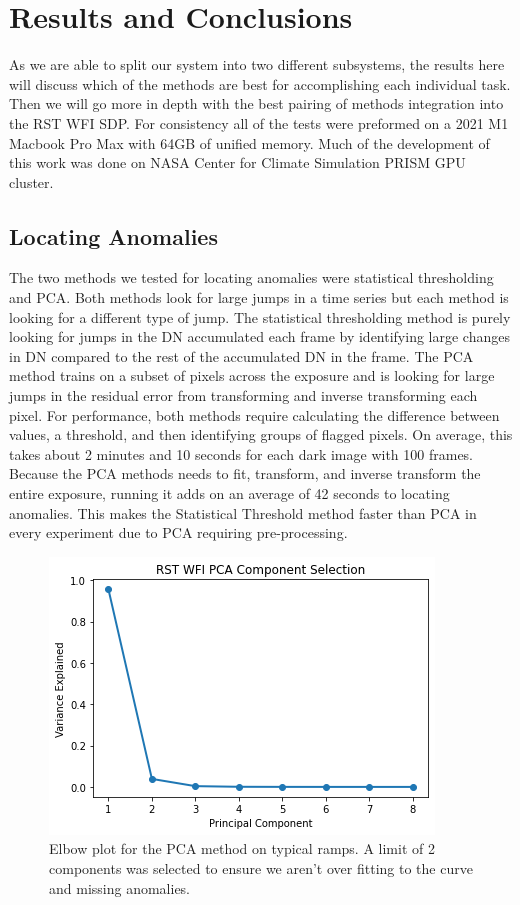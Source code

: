 \section{Results and Conclusions}
\label{chap5/sec:results}

As we are able to split our system into two different subsystems, the results here will discuss which of the methods are best for accomplishing each individual task. 
Then we will go more in depth with the best pairing of methods integration into the RST WFI SDP. 
For consistency all of the tests were preformed on a 2021 M1 Macbook Pro Max with 64GB of unified memory.
Much of the development of this work was done on NASA Center for Climate Simulation PRISM GPU cluster. 

\subsection{Locating Anomalies}
The two methods we tested for locating anomalies were statistical thresholding and PCA.
Both methods look for large jumps in a time series but each method is looking for a different type of jump.
The statistical thresholding method is purely looking for jumps in the DN accumulated each frame by identifying large changes in DN compared to the rest of the accumulated DN in the frame. 
The PCA method trains on a subset of pixels across the exposure and is looking for large jumps in the residual error from transforming and inverse transforming each pixel. 
For performance, both methods require calculating the difference between values, a threshold, and then identifying groups of flagged pixels. 
On average, this takes about 2 minutes and 10 seconds for each dark image with 100 frames. 
Because the PCA methods needs to fit, transform, and inverse transform the entire exposure, running it adds on an average of 42 seconds to locating anomalies. 
This makes the Statistical Threshold method faster than PCA in every experiment due to PCA requiring pre-processing. 

\begin{figure}
    \centering
    \includegraphics[width=.5\linewidth]{figs/5/elbow.png}
    \caption{Elbow plot for the PCA method on typical ramps. A limit of 2 components was selected to ensure we aren't over fitting to the curve and missing anomalies.}
    \label{chap5/fig:elbow}
\end{figure}

